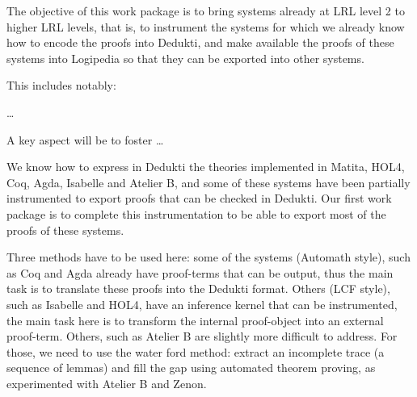 \begin{workpackage}[id=instrumentation,wphases=0-48,type=RTD,
  short=Instrument Provers,%
  title=Instrument proof systems to produce Dedukti proof,
  lead=Inr,
  UBoRM=14,
  InrRM=10,
  DelRM=48,
  GURM=48]


\begin{wpobjectives}
  The objective of this work package is to bring systems already at
  LRL level 2 to higher LRL levels, that is, to instrument the systems
  for which we already know how to encode the proofs into Dedukti, and
  make available the proofs of these systems into Logipedia so that
  they can be exported into other systems.

This includes notably:
  \begin{compactitem}
  \item \ldots
  \end{compactitem}
  A key aspect will be to foster \ldots
\end{wpobjectives}


\begin{wpdescription}
We know how to express in Dedukti the theories implemented in Matita,
HOL4, Coq, Agda, Isabelle and Atelier B, and some of these systems
have been partially instrumented to export proofs that can be checked
in Dedukti. Our first work package is to complete this instrumentation
to be able to export most of the proofs of these systems.

Three methods have to be used here: some of the systems
(Automath style), such as Coq and Agda already have
proof-terms that can be output, thus the main task is to translate
these proofs into the Dedukti format. Others (LCF style), such as
Isabelle and HOL4, have an inference kernel that can be
instrumented, the main task here is to transform
the internal proof-object into an external proof-term. Others, such as
Atelier B are slightly more difficult to address. For those,
we need to use the water ford method: extract an incomplete trace (a
sequence of lemmas) and fill the gap using automated theorem proving,
as experimented with Atelier B and Zenon.
\end{wpdescription}


\end{workpackage}
